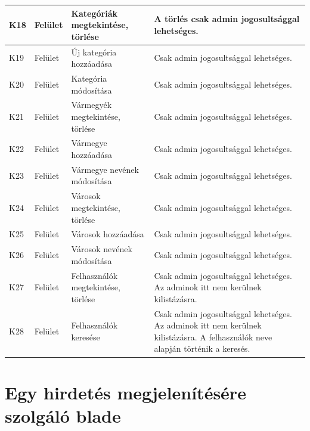 \documentclass[]{thesis-ekf}
\theoremstyle{definition}
\theoremstyle{remark}
\begin{document}
\begin{longtable}{|l|l|p{3cm}|p{8cm}|}
				K18 & Felület & Kategóriák megtekintése, törlése & A törlés csak admin jogosultsággal lehetséges. \\ \hline
				K19 & Felület & Új kategória hozzáadása & Csak admin jogosultsággal lehetséges. \\ \hline
				K20 & Felület & Kategória módosítása & Csak admin jogosultsággal lehetséges. \\ \hline
				K21 & Felület & Vármegyék megtekintése, törlése & Csak admin jogosultsággal lehetséges. \\ \hline
				K22 & Felület & Vármegye hozzáadása & Csak admin jogosultsággal lehetséges. \\ \hline
				K23 & Felület & Vármegye nevének módosítása & Csak admin jogosultsággal lehetséges. \\ \hline
				K24 & Felület & Városok megtekintése, törlése & Csak admin jogosultsággal lehetséges. \\ \hline
				K25 & Felület & Városok hozzáadása & Csak admin jogosultsággal lehetséges. \\ \hline
				K26 & Felület & Városok nevének módosítása & Csak admin jogosultsággal lehetséges. \\ \hline
				K27 & Felület & Felhasználók megtekintése, törlése & Csak admin jogosultsággal lehetséges. Az adminok itt nem kerülnek kilistázásra. \\ \hline
				K28 & Felület & Felhasználók keresése & Csak admin jogosultsággal lehetséges. Az adminok itt nem kerülnek kilistázásra. A felhasználók neve alapján történik a keresés. \\ \hline
				
			\end{longtable}
			\section*{Egy hirdetés megjelenítésére szolgáló blade}
				
\end{document}
